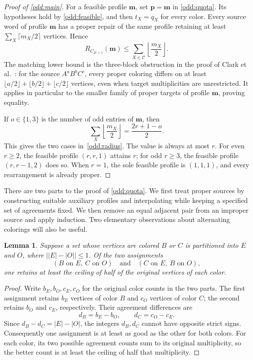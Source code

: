 \documentclass[10pt,a4paper]{amsart}
\numberwithin{equation}{section}
\newtheorem{lemma}[theorem]{Lemma}
\theoremstyle{definition}
\theoremstyle{remark}
\begin{document}
\begin{proof}[Proof of \cref{odd:main}]
For a feasible profile $\mathbf m$, set $\mathbf p=\mathbf m$ in
\cref{odd:quota}. Its hypotheses hold by
\cref{odd:feasible}, and then $t_X=q_X$ for every color.
Every source word of profile $\mathbf m$
has a proper repair of the same profile retaining at least
$\sum_X\lceil m_X/2\rceil$ vertices. Hence
\[
R_{C_{2r+1}}(\mathbf m)
\le\sum_{X\in\mathcal C}\left\lfloor\frac{m_X}{2}\right\rfloor.
\]
The matching lower bound is the three-block obstruction in the proof
of Clark et al.~\cite[Proposition~3.5]{clark2006}: for the source
$A^aB^bC^c$, every proper coloring differs on at least
$\lfloor a/2\rfloor+\lfloor b/2\rfloor+\lfloor c/2\rfloor$
vertices, even when target multiplicities are unrestricted.
It applies in particular to the smaller family of proper targets of
profile $\mathbf m$, proving equality.

If $o\in\{1,3\}$ is the number of odd entries of $\mathbf m$, then
\[
\sum_X\left\lfloor\frac{m_X}{2}\right\rfloor
=\frac{2r+1-o}{2}.
\]
This gives the two cases in~\eqref{odd:radius}. The value is always
at most $r$. For even $r\ge2$, the feasible profile $(r,r,1)$ attains
$r$; for odd $r\ge3$, the feasible profile $(r,r-1,2)$ does so.
When $r=1$, the sole feasible profile is $(1,1,1)$, and every
rearrangement is already proper.
\end{proof}


There are two parts to the proof of \cref{odd:quota}. We first treat proper sources by
constructing suitable auxiliary profiles and interpolating while keeping
a specified set of agreements fixed. We then remove an equal adjacent
pair from an improper source and apply induction. Two elementary
observations about alternating colorings will also be useful.

\begin{lemma}\label{odd:binary}
Suppose a set whose vertices are colored $B$ or $C$ is partitioned
into $E$ and $O$, where $\bigl||E|-|O|\bigr|\le1$.
Of the two assignments
\[
(B\text{ on }E,\ C\text{ on }O)
\quad\text{and}\quad
(C\text{ on }E,\ B\text{ on }O),
\]
one retains at least the ceiling of half of the original vertices of
each color.
\end{lemma}
\begin{proof}
Write $b_E,b_O,c_E,c_O$ for the original color counts in the two
parts. The first assignment retains $b_E$ vertices of color $B$ and
$c_O$ vertices of color $C$; the second retains $b_O$ and $c_E$,
respectively. Their agreement differences are
\[
d_B=b_E-b_O,\qquad d_C=c_O-c_E.
\]
Since $d_B-d_C=|E|-|O|$, the integers $d_B,d_C$ cannot have opposite
strict signs. Consequently one assignment is at least as good as the
other for both colors. For each color, its two possible agreement
counts sum to its original multiplicity, so the better count is at
least the ceiling of half that multiplicity.
\end{proof}
\end{document}
